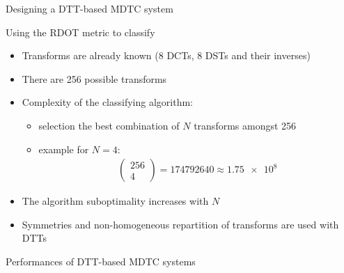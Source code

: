 \documentclass[10pt]{beamer} %
\begin{document}
\begin{frame}{Designing a DTT-based MDTC system}
	\begin{block}{Using the RDOT metric to classify}
		\begin{itemize}
			\item Transforms are already known (8 DCTs, 8 DSTs and their
				inverses)
			\item There are 256 possible transforms
			\item Complexity of the classifying algorithm:
				\begin{itemize}
					\item selection the best combination of $N$ transforms
						amongst 256
					\item example for $N=4$:
						\vspace{-0.5em}
						\begin{align}
							\begin{pmatrix}
								256 \\
								4
							\end{pmatrix} =
							\num{174792640}\approx\num{1.75e8}
						\end{align}
				\end{itemize}
			\item The algorithm suboptimality increases with $N$
			\item Symmetries and non-homogeneous repartition of transforms are
				used with DTTs
		\end{itemize}
	\end{block}
\end{frame}

\begin{frame}{Performances of DTT-based MDTC systems}
	\only<1>{}
	\only<2>{}
\end{frame}
\end{document}
